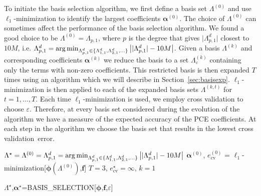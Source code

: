 To initiate the basis selection algorithm, we first define a basis set $\Lambda^{(0)}$ and use $\ell_1$-minimization to identify the largest coefficients $\boldsymbol{\alpha}^{(0)}$. The choice of $\Lambda^{(0)}$
can sometimes affect the performance of the basis selection algorithm. We found a good choice to be $\Lambda^{(0)}=\Lambda_{p,1}$,
where $p$ is the degree that gives $\lvert\Lambda^d_{p,1}\rvert$ closest to $10M$, i.e. $\Lambda^d_{p,1} = \operatorname*{arg\,min}_{\Lambda^d_{p,1}\in\{\Lambda^d_{1,1},\Lambda^d_{2,1},\ldots\}}\left\lvert \lvert\Lambda^d_{p,1}\rvert-10M \right\rvert$.
Given a basis $\Lambda^{(k)}$ and corresponding coefficients $\boldsymbol{\alpha}^{(k)}$ we reduce the basis to a set $\Lambda^{(k)}_\varepsilon$ containing only the terms with non-zero coefficients. 
This restricted basis is then expanded $T$ times using an algorithm which we will describe in Section~\ref{sec:basisexp}. $\ell_1$-minimization is then applied to each of the expanded basis 
sets $\Lambda^{(k,t)}$ for $t=1,\dots, T$.
Each time $\ell_1$-minimization is used, we employ cross validation to choose $\varepsilon$. Therefore, at every basis set considered during the evolution of the algorithm we have a measure
of the expected accuracy of the PCE coefficients. At each step in the algorithm we choose the basis set that results in the lowest cross validation~error.


\begin{algorithm}[H]
\DontPrintSemicolon %
\footnotesize
$\Lambda^{\star} = \Lambda^{(0)} = \Lambda^d_{p,1} = \operatorname*{arg\,min}_{\Lambda^d_{p,1}\in\{\Lambda^d_{1,1},\Lambda^d_{2,1},\ldots\}}\left\lvert \lvert\Lambda^d_{p,1}\rvert-10M \right\rvert$\;
$\boldsymbol{\alpha}^{(0)}$, $e_{\mathrm{cv}}^{(0)}$ = $\ell_1$-minimization[$\boldsymbol{\phi}(\Lambda^{(0)})$,$\mathbf{f}$]\;
$T=3$, $e_{\mathrm{cv}}^\star = \infty$, $k = 1$\;
\caption{$\Lambda^\star$,$\boldsymbol{\alpha}^\star$=BASIS\_SELECTION[$\boldsymbol{\phi}$,$\mathbf{f}$,$\varepsilon$] }
\label{alg:basis-selection}
\end{algorithm}

